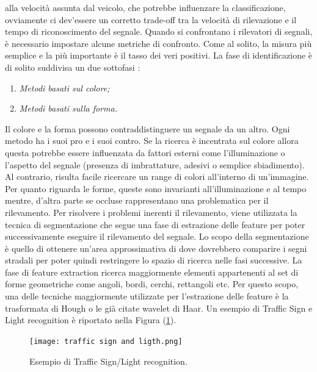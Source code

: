 alla velocità assunta dal veicolo, che potrebbe influenzare la classificazione, 
ovviamente ci dev'essere un corretto trade-off tra la velocità di rilevazione e 
il tempo di riconoscimento del segnale. Quando si confrontano i rilevatori 
di segnali, è necessario impostare alcune metriche di confronto. Come al 
solito, la misura più semplice e la più importante è il tasso dei veri positivi.
La fase di identificazione è di solito suddivisa un due sottofasi \cite{sign-rec}:
\begin{enumerate}
    \item \emph{Metodi basati sul colore;}
    \item \emph{Metodi basati sulla forma.}
\end{enumerate}
Il colore e la forma possono contraddistinguere un segnale da un altro.
Ogni metodo ha i suoi pro e i suoi contro. Se la ricerca è incentrata sul 
colore allora questa potrebbe essere influenzata da fattori esterni come 
l'illuminazione o l'aspetto del segnale (presenza di imbrattature, adesivi 
o semplice sbiadimento). Al contrario, risulta facile ricercare un range di 
colori all'interno di un'immagine. Per quanto riguarda le forme, queste 
sono invarianti all'illuminazione e al tempo mentre, d'altra parte se occluse 
rappresentano una problematica per il rilevamento. Per risolvere i problemi 
inerenti il rilevamento, viene utilizzata la tecnica di segmentazione che segue 
una fase di estrazione delle feature per poter successivamente eseguire il 
rilevamento del segnale. Lo scopo della segmentazione è quello di ottenere 
un'area approssimativa di dove dovrebbero comparire i segni stradali per 
poter quindi restringere lo spazio di ricerca nelle fasi successive. La fase 
di feature extraction ricerca maggiormente elementi appartenenti al set di 
forme geometriche come angoli, bordi, cerchi, rettangoli etc. Per questo 
scopo, una delle tecniche maggiormente utilizzate per l'estrazione delle 
feature è la trasformata di Hough o le già citate wavelet di Haar. Un 
esempio di Traffic Sign e Light recognition è riportato nella Figura (\ref{traffic sing-ligth}).
\begin{figure}
    \centering
    \texttt{[image: traffic sign and ligth.png]}
    \centering
    \caption{Esempio di Traffic Sign/Light recognition.}
    \label{traffic sing-ligth}
\end{figure}

